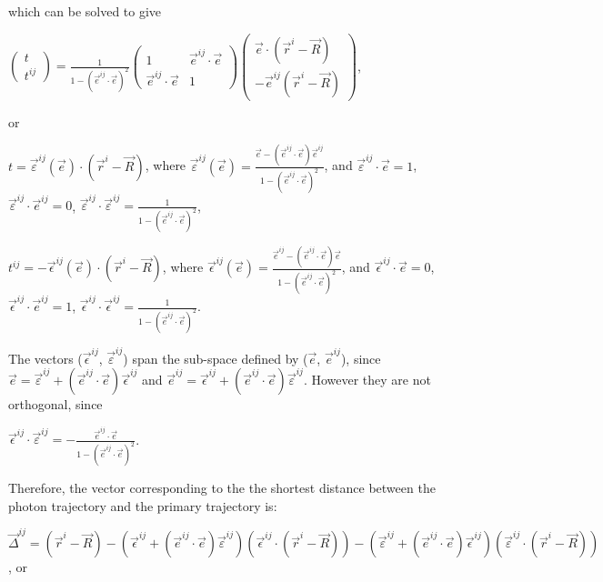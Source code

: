 \documentclass[letterpaper]{article}
\begin{document}
which can be solved to give

$\displaystyle 
\left(\begin{array}{c}t \\ t^{ij}\end{array}\right) 
= \frac{1}{1-(\vec{e}^{ij}\cdot\vec{e})^{2}}
\left(\begin{array}{cc}
1 & \vec{e}^{ij}\cdot\vec{e} \\ 
\vec{e}^{ij}\cdot\vec{e} & 1
\end{array}\right)
\left(\begin{array}{c}
\vec{e}\cdot(\vec{r}^{i}-\vec{R})  \\ 
-\vec{e}^{ij}(\vec{r}^{i}-\vec{R}) 
\end{array}\right)$,

or

$\displaystyle t=\vec{\varepsilon}^{ij}(\vec{e})\cdot(\vec{r}^{i}
-\vec{R})$, where 
$\displaystyle \vec{\varepsilon}^{ij}(\vec{e})
=\frac{\vec{e}-(\vec{e}^{ij}\cdot\vec{e})\vec{e}^{ij}}
{1-(\vec{e}^{ij}\cdot\vec{e})^{2}}$, and 
$\displaystyle \vec{\varepsilon}^{ij}\cdot\vec{e}=1$, 
$\displaystyle \vec{\varepsilon}^{ij}\cdot\vec{e}^{ij}=0$,
$\displaystyle \vec{\varepsilon}^{ij}\cdot\vec{\varepsilon}^{ij}
=\frac{1}{1-(\vec{e}^{ij}\cdot\vec{e})^{2}}$,

$\displaystyle t^{ij}=-\vec{\epsilon}^{ij}(\vec{e})\cdot(\vec{r}^{i}
-\vec{R})$, where 
$\displaystyle \vec{\epsilon}^{ij}(\vec{e})
=\frac{\vec{e}^{ij}-(\vec{e}^{ij}\cdot\vec{e})\vec{e}}
{1-(\vec{e}^{ij}\cdot\vec{e})^{2}}$, and 
$\displaystyle \vec{\epsilon}^{ij}\cdot\vec{e}=0$,
$\displaystyle \vec{\epsilon}^{ij}\cdot\vec{e}^{ij}=1$,
$\displaystyle \vec{\epsilon}^{ij}\cdot\vec{\epsilon}^{ij}
=\frac{1}{1-(\vec{e}^{ij}\cdot\vec{e})^{2}}$.

The vectors ($\vec{\epsilon}^{ij}$, $\vec{\varepsilon}^{ij}$) span the
sub-space defined by ($\vec{e}$, $\vec{e}^{ij}$), since
$\vec{e}=\vec{\varepsilon}^{ij}
+(\vec{e}^{ij}\cdot\vec{e})\vec{\epsilon}^{ij}$ and 
$\vec{e}^{ij}=\vec{\epsilon}^{ij}
+(\vec{e}^{ij}\cdot\vec{e})\vec{\varepsilon}^{ij}$. However they are not
orthogonal, since

$\displaystyle \vec{\epsilon}^{ij}\cdot\vec{\varepsilon}^{ij}
=-\frac{\vec{e}^{ij}\cdot\vec{e}}
{1-\left(\vec{e}^{ij}\cdot\vec{e}\right)^{2}}$.

Therefore, the vector corresponding to the the shortest distance between
the photon trajectory and the primary trajectory is:

$\displaystyle \vec{\Delta}^{ij}
=(\vec{r}^{i}-\vec{R})-\left(\vec{\epsilon}^{ij}
+(\vec{e}^{ij}\cdot\vec{e})\vec{\varepsilon}^{ij}\right)
\left(\vec{\epsilon}^{ij}\cdot(\vec{r}^{i}-\vec{R})\right)
-\left(\vec{\varepsilon}^{ij}+(\vec{e}^{ij}\cdot\vec{e})
\vec{\epsilon}^{ij}\right)
\left(\vec{\varepsilon}^{ij}\cdot(\vec{r}^{i}-\vec{R})\right)$, or
\end{document}
